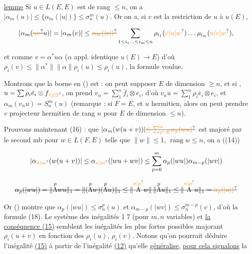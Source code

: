 \uline{lemme} Si $u\in L(E,E)$ est de rang $\leq n$, on a $|\alpha_m(u)|\leq\{\alpha_m(|u|)\}\leq\sigma_n^m(u)$. Or on a, si $v$ est la restriction de $u$ à $u(E)$, 

\[
|\alpha_m(\deleted{\unsure{uv}}u)|=|\alpha_m(v)|\leq\deleted{\unsure{\alpha_m(|v|)}}\sum_{1\leq i_1\ldots\leq i_m\leq n}\rho_{i_1}(\unsure{v|u|w})\ldots\rho_{i_m}(\unsure{u|v|w}),
\]

et comme  $v=\alpha^*u\alpha$ ($\alpha$ appl. identique $u(E)\longrightarrow E$) d'où $\rho_i(v)\leq\lVert\alpha^*\rVert\lVert\alpha\rVert\rho_i(u)\leq\rho_i(u)$, la formule voulue.


 Montrons que la borne en () est  : on peut supposer $E$ de dimension $\geq n$,  et si , $u=\sum\rho_i\bar e_i\otimes f_{\unsure{i|j|2}}$, on prend $v_n=\sum_1^n\bar f_i\otimes e_i$, d'où $v_nu=\sum_1^n\rho_i\bar e_i\otimes e_i$, et $\alpha_m(v_nu)=S_n^m(u)$ (remarque : si $F=E$, et $u$ hermitien, alors on peut prendre $v$ projecteur hermitien de rang $n$ pour $E$ de dimension $\leq n$).

Prouvons maintenant (16) :   que $|\alpha_m(w(u+v))|\deleted{\unsure{\leq\sum_{p=0}^{n}\alpha_p(wu)}}$ est majoré par le second mb pour  $w\in L(F,E)$ telle que $\lVert w\rVert\leq1$, $\operatorname{rang}w\leq n$,   on a ((14))

\[
|\alpha_{\unsure{n|m}}(w(u+v))|\leq\alpha_{\unsure{n|m}}(|wu+wv|)\leq\sum_{p=0}^{m}\alpha_p(|wu|)\alpha_{m-p}(|wv|)
\]


\[
\deleted{\alpha_p(|wu|)=\lVert\overset{p}{\Lambda}wu\rVert_1=\lVert(\overset{p}{\Lambda}w)(\overset{p}{\Lambda}u)\rVert_1\leq\lVert\overset{\unsure{n|p}}{\Lambda}w\rVert\,\lVert\overset{p}{\Lambda}u\rVert_1\leq\lVert\overset{\unsure{n|p}}{\Lambda}u\rVert_1=\unsure{\alpha_p(|u|)}}
\]

 Or () montre que $\alpha_p(|wu|)\leq\sigma_n^p(u)$ et $\alpha_{m-p}(|wv|)\leq\sigma_n^{m-p}(v)$, d'où la formule (18).
Le système des inégalités \textcircled{17} (pour $m,n$ variables) et \uline{la conséquence (15)} semblent les inégalités les plus fortes possibles majorant   $\rho_i(u+v)$ en fonction des $\rho_i(u)$, $\rho_i(v)$. Notons qu'on pourrait déduire   l'inégalité \uline{(15)} à partir de l'inégalité \uline{(12)} qu'elle \uline{généralise}, \uline{pour cela signalons} la 


